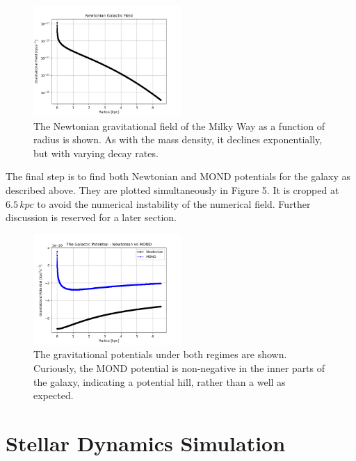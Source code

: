 \documentclass[11pt, twocolumn]{article}
\begin{document}
     \begin{figure}[h]
        \includegraphics[width=0.5\textwidth]{images/nfield.png}
        \caption{The Newtonian gravitational field of the Milky Way as a function of radius is shown. As with the mass density, it declines exponentially, but with varying decay rates.}
        \label{fig:rotation}
    \end{figure}

    The final step is to find both Newtonian and MOND potentials for the galaxy as described above. They are plotted simultaneously in Figure 5. It is cropped at $6.5 \, \si{kpc}$ to avoid the numerical instability of the numerical field. Further discussion is reserved for a later section. 

    \begin{figure}[h]
        \includegraphics[width=0.5\textwidth]{images/galpot.png}
        \caption{The gravitational potentials under both regimes are shown. Curiously, the MOND potential is non-negative in the inner parts of the galaxy, indicating a potential hill, rather than a well as expected.}
        \label{fig:rotation}
    \end{figure}

    \section*{Stellar Dynamics Simulation}
\end{document}
